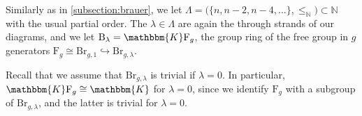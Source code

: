 \documentclass[a4paper,11pt]{amsart}
\renewcommand{\dots}{\text{...}}
\newcommand{\setstuff}[1]{\mathrm{#1}}
\newcommand{\KK}{\mathbbm{K}}
\newcommand{\N}{\mathbb{N}}
\numberwithin{equation}{section}
\let\fullref\autoref
\begin{document}
Similarly as in \fullref{subsection:brauer}, 
we let $\Lambda=\big(\{n,n-2,n-4,\dots\},\leq_{\N}\big)\subset\N$ 
with the usual partial order.
The $\lambda\in\Lambda$ are again the through strands of our diagrams, 
and we let $\setstuff{B}_{\lambda}=\KK\setstuff{F}_{g}$, 
the group ring of the free group in $g$ 
generators $\setstuff{F}_{g}\cong\setstuff{Br}_{g,1}\hookrightarrow\setstuff{Br}_{g,\lambda}$.

\begin{remark}
Recall that we assume that $\setstuff{Br}_{g,\lambda}$ 
is trivial if $\lambda=0$.
In particular, $\KK\setstuff{F}_{g}\cong\KK$ for $\lambda=0$, since 
we identify $\setstuff{F}_{g}$ with a subgroup of $\setstuff{Br}_{g,\lambda}$, 
and the latter is trivial for $\lambda=0$.
\end{remark}
\end{document}
